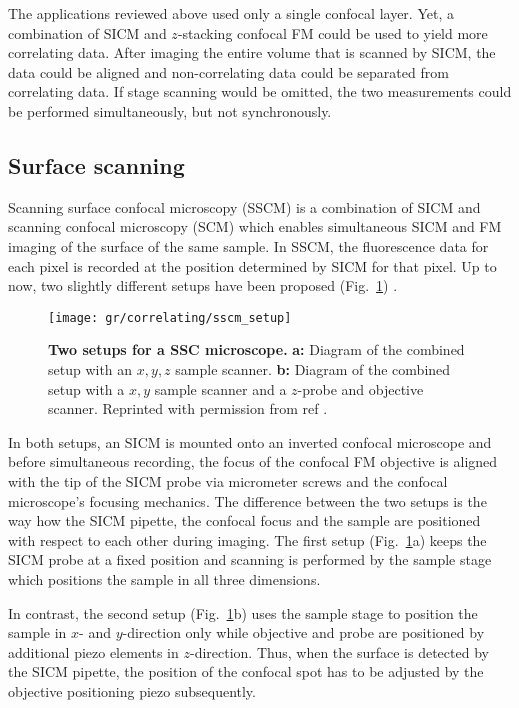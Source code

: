 The applications reviewed above used only a single confocal layer. Yet,
a combination of SICM and $z$-stacking confocal FM could be used to yield more
correlating data. After imaging the entire volume that is scanned by SICM, the
data could be aligned and non-correlating data could be separated from
correlating data. If stage scanning would be omitted, the two measurements
could be performed simultaneously, but not synchronously.  


\subsection{Surface scanning}

Scanning surface confocal microscopy (SSCM) \cite{Gorelik2002a} is a
combination of SICM and scanning confocal microscopy (SCM) which enables
simultaneous SICM and FM imaging of the surface of the same sample. In SSCM,
the fluorescence data for each pixel is recorded at the position determined by
SICM for that pixel. Up to now, two slightly different setups have been proposed
(Fig.~\ref{fig:sscm_setup}) \cite{Gorelik2002a,Shevchuk2013}.

\begin{figure}
  \texttt{[image: gr/correlating/sscm\_setup]}

  \caption{%
    \textbf{Two setups for a SSC microscope.}
    \textbf{a:} Diagram of the combined setup with an $x,y,z$ sample scanner.
    \textbf{b:} Diagram of the combined setup with a $x,y$ sample scanner and
    a $z$-probe and objective scanner. 
    Reprinted with permission from ref \cite{Shevchuk2013}.
  }
  \label{fig:sscm_setup}
\end{figure}

In both setups, an SICM is mounted onto an inverted confocal microscope and
before simultaneous recording, the focus of the confocal FM objective is
aligned with the tip of the SICM probe via micrometer screws and the confocal
microscope's focusing mechanics. The
difference between the two setups is the way how the SICM pipette, the
confocal focus and the sample are positioned with respect to each other during
imaging. The
first setup (Fig.~\ref{fig:sscm_setup}a) keeps the 
SICM probe at a fixed position and scanning is performed by the sample
stage which positions the sample in all three dimensions.

In contrast, the second setup (Fig.~\ref{fig:sscm_setup}b) uses the sample
stage to position the sample in $x$- and $y$-direction only while objective
and probe are positioned by additional piezo elements in $z$-direction. Thus,
when the surface is detected by the SICM pipette,  the position of
the confocal spot has to be adjusted by the objective positioning piezo subsequently.

